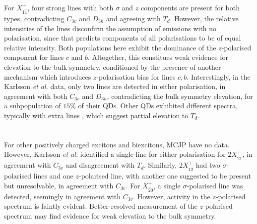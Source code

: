 For $X^+_{1\bar{1}}$, four strong lines with both $\sigma$ and $z$ components are present for both types, contradicting $C_{3v}$ and $D_{3h}$ and agreeing with $T_d$. However, the relative intensities of the lines disconfirm the assumption of emissions with no polarisation, since that predicts components of all polarisations to be of equal relative intensity. Both populations here exhibit the dominance of the $z$-polarised component for lines $c$ and $b$. Altogether, this constitues weak evidence for elevation to the bulk symmetry, conditioned by the presence of another mechanism which introduces $z$-polarisation bias for lines $c,b$. Interestingly, in the Karlsson \textit{et al.} data, only two lines are detected in either polarisation, in agreement with both $C_{3v}$ and $D_{3h}$, contradicting the bulk symmetry elevation, for a subpopulation of $15\%$ of their QDs. Other QDs exhibited different spectra, typically with extra lines \cite[Fig.~19]{karlsson}, which suggest partial elevation to $T_d$.
\\
\\\hfill\\

For other positively charged excitons and biexcitons, MCJP have no data. However, Karlsson \textit{et al.} identified a single line for either polarisation for $2X^+_{2\bar{1}}$, in agreement with $C_{3v}$ and disagreement with $T_d$. Similarly, $2X^+_{1\bar{2}}$ had two $\sigma$-polarised lines and one $z$-polarised line, with another one suggested to be present but unresolvable, in agreement with $C_{3v}$. For $X^+_{\bar{2}0}$, a single $\sigma$-polarised line was detected, seemingly in agreement with $C_{3v}$. However, activity in the $z$-polarised spectrum is faintly evident. Better-resolved measurement of the $z$-polarised spectrum may find evidence for weak elevation to the bulk symmetry.

